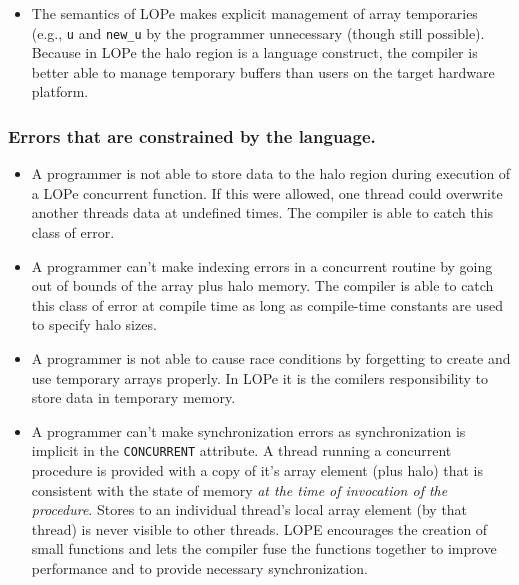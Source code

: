 \begin{itemize}
\item
The semantics of LOPe makes explicit management of array temporaries (e.g., \texttt{u} and
\texttt{new\_u} by the programmer unnecessary (though still possible).  Because in LOPe the
halo region is a language construct, the compiler is better able to manage temporary
buffers than users on the target hardware platform.

\end{itemize}

\subsubsection{Errors that are constrained by the language.}
\begin{itemize}

\item
A programmer is not able to store data to the halo region during execution of a LOPe concurrent
function.  If this were allowed, one thread could overwrite another threads data at undefined times.
The compiler is able to catch this class of error.

\item
A programmer can't make indexing errors in a concurrent routine by going out of bounds of the array
plus halo memory.  The compiler is able to catch this class of error at compile time as long as
compile-time constants are used to specify halo sizes.

\item
A programmer is not able to cause race conditions by forgetting to create and use temporary arrays
properly.  In LOPe it is the comilers responsibility to store data in temporary memory.

\item
A programmer can't make synchronization errors as synchronization is implicit in the
\texttt{CONCURRENT} attribute.  A thread running a concurrent procedure is provided with a copy of
it's array element (plus halo) that is consistent with the state of memory \emph{at the time of
  invocation of the procedure}.  Stores to an individual thread's local array element (by that
thread) is never visible to other threads.  LOPE encourages the creation of small functions and lets
the compiler fuse the functions together to improve performance and to provide necessary
synchronization.

\end{itemize}
